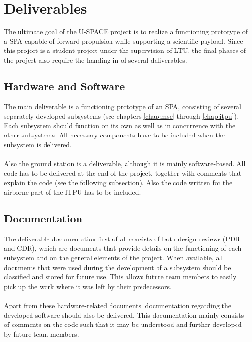 \section{Deliverables}
%
The ultimate goal of the \ac{U-SPACE} project is to realize a functioning prototype of a \ac{SPA} capable of forward propulsion while supporting a scientific payload. Since this project is a student project under the supervision of \ac{LTU}, the final phases of the project also require the handing in of several deliverables.
%
\subsection{Hardware and Software}
%
The main deliverable is a functioning prototype of an \ac{SPA}, consisting of several separately developed subsystems (see chapters \ref{chap:mse} through \ref{chap:itpu}). Each subsystem should function on its own as well as in concurrence with the other subsystems. All necessary components have to be included when the subsystem is delivered.
\\
\\
Also the ground station is a deliverable, although it is mainly software-based. All code has to be delivered at the end of the project, together with comments that explain the code (see the following subsection). Also the code written for the airborne part of the \ac{ITPU} has to be included.
%
\subsection{Documentation}
%
The deliverable documentation first of all consists of both design reviews (\ac{PDR} and \ac{CDR}), which are documents that provide details on the functioning of each subsystem and on the general elements of the project. When available, all documents that were used during the development of a subsystem should be classified and stored for future use. This allows future team members to easily pick up the work where it was left by their predecessors.
\\
\\
Apart from these hardware-related documents, documentation regarding the developed software should also be delivered. This documentation mainly consists of comments on the code such that it may be understood and further developed by future team members.